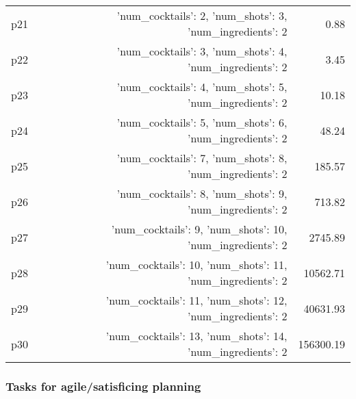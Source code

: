 \documentclass{article}
\begin{document}
\begin{center}
\begin{tabular}{@{}l|r|r@{}}
  p21&{'num\_cocktails': 2, 'num\_shots': 3, 'num\_ingredients': 2}&0.88\\
  p22&{'num\_cocktails': 3, 'num\_shots': 4, 'num\_ingredients': 2}&3.45\\
  p23&{'num\_cocktails': 4, 'num\_shots': 5, 'num\_ingredients': 2}&10.18\\
  p24&{'num\_cocktails': 5, 'num\_shots': 6, 'num\_ingredients': 2}&48.24\\
  p25&{'num\_cocktails': 7, 'num\_shots': 8, 'num\_ingredients': 2}&185.57\\
  p26&{'num\_cocktails': 8, 'num\_shots': 9, 'num\_ingredients': 2}&713.82\\
  p27&{'num\_cocktails': 9, 'num\_shots': 10, 'num\_ingredients': 2}&2745.89\\
  p28&{'num\_cocktails': 10, 'num\_shots': 11, 'num\_ingredients': 2}&10562.71\\
  p29&{'num\_cocktails': 11, 'num\_shots': 12, 'num\_ingredients': 2}&40631.93\\
  p30&{'num\_cocktails': 13, 'num\_shots': 14, 'num\_ingredients': 2}&156300.19
                            \end{tabular}
                            \end{center}
                    

                                \subsubsection*{Tasks for agile/satisficing planning}
                                
\end{document}
